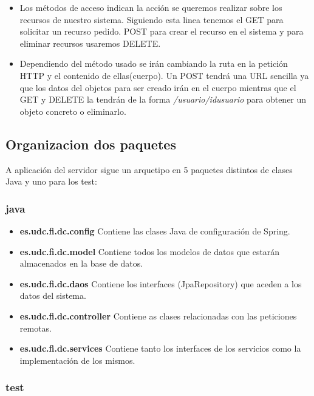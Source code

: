 \begin{itemize}
\item Los métodos de acceso indican la acción se queremos realizar sobre los recursos de nuestro sistema. Siguiendo esta linea tenemos el GET para solicitar un recurso pedido. POST para crear el recurso en el sistema y  para eliminar recursos usaremos DELETE. 



\item Dependiendo del método usado se irán cambiando la ruta en la petición HTTP y el contenido de ellas(cuerpo). Un POST tendrá una URL sencilla ya que los datos del objetos para ser creado irán en el cuerpo mientras que el GET y DELETE la tendrán de la forma \textit{ /usuario/{idusuario}} para obtener un objeto concreto o eliminarlo.





 


\end{itemize}

\subsection{Organizacion dos paquetes}
A aplicación del servidor sigue un arquetipo en 5 paquetes distintos de clases Java y uno para los test:
\subsubsection{java}
\begin{itemize}
\item\textbf{ es.udc.fi.dc.config} Contiene las clases Java de configuración de Spring.
\item \textbf{es.udc.fi.dc.model} Contiene todos los modelos de datos que estarán almacenados en la base de datos.
\item \textbf{es.udc.fi.dc.daos} Contiene los interfaces (JpaRepository) que aceden a los datos del sistema.
\item \textbf{es.udc.fi.dc.controller} Contiene as clases relacionadas  con las peticiones remotas.
\item  \textbf{es.udc.fi.dc.services} Contiene tanto los interfaces de los servicios como la implementación de los mismos.


\end{itemize}
\subsubsection{test}

